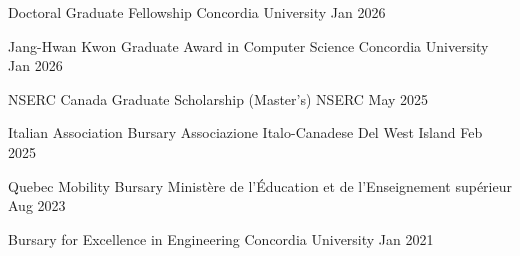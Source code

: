 
\begin{cvhonors}

  \cvhonor
    {Doctoral Graduate Fellowship} %
    {} %
    {Concordia University} %
    {Jan 2026} %

  \cvhonor
    {Jang-Hwan Kwon Graduate Award in Computer Science} %
    {} %
    {Concordia University} %
    {Jan 2026} %

  \cvhonor
    {NSERC Canada Graduate Scholarship (Master's)} %
    {} %
    {NSERC} %
    {May 2025} %

  \cvhonor
    {Italian Association Bursary} %
    {} %
    {Associazione Italo-Canadese Del West Island} %
    {Feb 2025} %


  \cvhonor
    {Quebec Mobility Bursary} %
    {} %
    {Ministère de l'Éducation et de l'Enseignement supérieur} %
    {Aug 2023} %


  \cvhonor
    {Bursary for Excellence in Engineering} %
    {} %
    {Concordia University} %
    {Jan 2021} %

\end{cvhonors}

